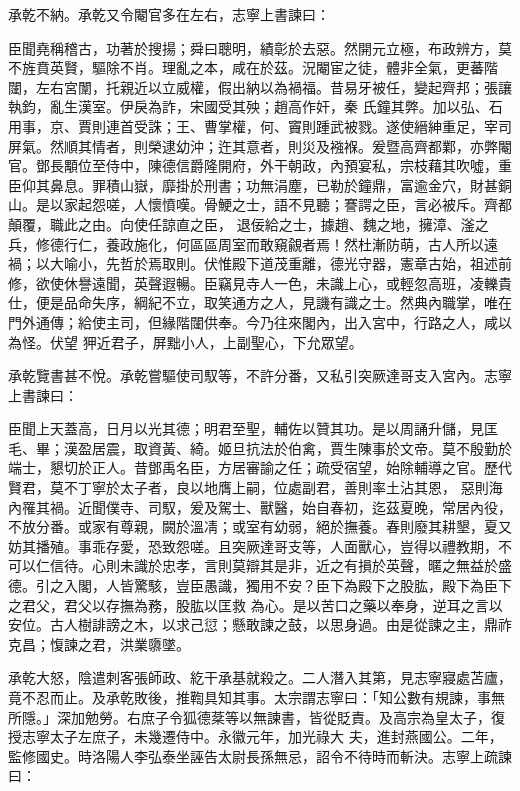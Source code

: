 \begin{pinyinscope}
 承乾不納。承乾又令閹官多在左右，志寧上書諫曰：



 臣聞堯稱稽古，功著於搜揚；舜曰聰明，績彰於去惡。然開元立極，布政辨方，莫不旌賁英賢，驅除不肖。理亂之本，咸在於茲。況閹宦之徒，體非全氣，更蕃階闥，左右宮闈，托親近以立威權，假出納以為禍福。昔易牙被任，變起齊邦；張讓執鈞，亂生漢室。伊戾為詐，宋國受其殃；趙高作奸，秦
 氏鐘其弊。加以弘、石用事，京、賈則連首受誅；王、曹掌權，何、竇則踵武被戮。遂使縉紳重足，宰司屏氣。然順其情者，則榮逮幼沖；迕其意者，則災及襁褓。爰暨高齊都鄴，亦弊閹官。鄧長顒位至侍中，陳德信爵隆開府，外干朝政，內預宴私，宗枝藉其吹噓，重臣仰其鼻息。罪積山嶽，靡掛於刑書；功無涓塵，已勒於鐘鼎，富逾金穴，財甚銅山。是以家起怨嗟，人懷憤嘆。骨鯁之士，語不見聽；謇諤之臣，言必被斥。齊都顛覆，職此之由。向使任諒直之臣，
 退佞給之士，據趙、魏之地，擁漳、滏之兵，修德行仁，養政施化，何區區周室而敢窺覦者焉！然杜漸防萌，古人所以遠禍；以大喻小，先哲於焉取則。伏惟殿下道茂重離，德光守器，憲章古始，祖述前修，欲使休譽遠聞，英聲遐暢。臣竊見寺人一色，未識上心，或輕忽高班，凌轢貴仕，便是品命失序，綱紀不立，取笑通方之人，見譏有識之士。然典內職掌，唯在門外通傳；給使主司，但緣階闥供奉。今乃往來閣內，出入宮中，行路之人，咸以為怪。伏望
 狎近君子，屏黜小人，上副聖心，下允眾望。



 承乾覽書甚不悅。承乾嘗驅使司馭等，不許分番，又私引突厥達哥支入宮內。志寧上書諫曰：



 臣聞上天蓋高，日月以光其德；明君至聖，輔佐以贊其功。是以周誦升儲，見匡毛、畢；漢盈居震，取資黃、綺。姬旦抗法於伯禽，賈生陳事於文帝。莫不殷勤於端士，懇切於正人。昔鄧禹名臣，方居審諭之任；疏受宿望，始除輔導之官。歷代賢君，莫不丁寧於太子者，良以地膺上嗣，位處副君，善則率土沾其恩，
 惡則海內罹其禍。近聞僕寺、司馭，爰及駕士、獸醫，始自春初，迄茲夏晚，常居內役，不放分番。或家有尊親，闕於溫凊；或室有幼弱，絕於撫養。春則廢其耕墾，夏又妨其播殖。事乖存愛，恐致怨嗟。且突厥達哥支等，人面獸心，豈得以禮教期，不可以仁信待。心則未識於忠孝，言則莫辯其是非，近之有損於英聲，暱之無益於盛德。引之入閣，人皆驚駭，豈臣愚識，獨用不安？臣下為殿下之股肱，殿下為臣下之君父，君父以存撫為務，股肱以匡救
 為心。是以苦口之藥以奉身，逆耳之言以安位。古人樹誹謗之木，以求己愆；懸敢諫之鼓，以思身過。由是從諫之主，鼎祚克昌；愎諫之君，洪業隳墜。



 承乾大怒，陰遣刺客張師政、紇干承基就殺之。二人潛入其第，見志寧寢處苫廬，竟不忍而止。及承乾敗後，推鞫具知其事。太宗謂志寧曰：「知公數有規諫，事無所隱。」深加勉勞。右庶子令狐德棻等以無諫書，皆從貶責。及高宗為皇太子，復授志寧太子左庶子，未幾遷侍中。永徽元年，加光祿大
 夫，進封燕國公。二年，監修國史。時洛陽人李弘泰坐誣告太尉長孫無忌，詔令不待時而斬決。志寧上疏諫曰：




\end{pinyinscope}
